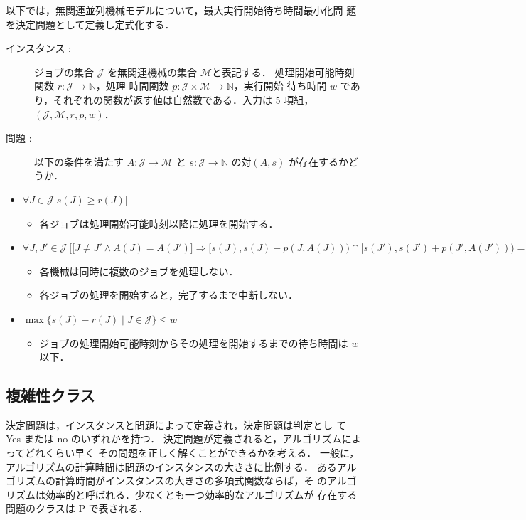 \documentclass[12pt]{optlab-bachelor}
\begin{document}
以下では，無関連並列機械モデルについて，最大実行開始待ち時間最小化問
題を決定問題として定義し定式化する．

\begin{description}

  \item[インスタンス : ] ジョブの集合 $\mathcal{J}$ を無関連機械の集合 $\mathcal{M}$と表記する．
  処理開始可能時刻関数 $r : \mathcal{J} \to \mathbb{N}$，処理
  時間関数 $p : \mathcal{J} \times \mathcal{M} \to \mathbb{N}$，実行開始
  待ち時間 $w$ であり，それぞれの関数が返す値は自然数である．入力は 5 項組，$(\mathcal{J}, \mathcal{M}, r, p, w)$．

  \item[問題 : ] 以下の条件を満たす $A : \mathcal{J} \to \mathcal{M}$ と $s : \mathcal{J} \to \mathbb{N}$ の対$(A,s)$ が存在するかどうか．
\end{description}

\begin{itemize}
  \item $\forall J \in \mathcal{J}\big[s(J) \ge r(J) \big]$
  \begin{itemize}
    \item 各ジョブは処理開始可能時刻以降に処理を開始する．
  \end{itemize}
  \item {\footnotesize $\forall J, J' \in \mathcal{J}\ \Big[ \big[J\ne J' \land A(J) = A(J')\big] \Rightarrow [s(J), s(J)+p(J,A(J))) \cap[s(J'), s(J')+p(J', A(J'))) = \emptyset \Big]$}
  \begin{itemize}
    \item 各機械は同時に複数のジョブを処理しない．
    \item 各ジョブの処理を開始すると，完了するまで中断しない．
  \end{itemize}
  \item $\max\big\{s(J) - r(J) \mid J \in \mathcal{J}\big\} \le w$
  \begin{itemize}
    \item ジョブの処理開始可能時刻からその処理を開始するまでの待ち時間は $w$ 以下．
  \end{itemize}
\end{itemize}

\subsection{複雑性クラス}
決定問題は，インスタンスと問題によって定義され，決定問題は判定とし
て Yes または no のいずれかを持つ．
決定問題が定義されると，アルゴリズムによってどれくらい早く
その問題を正しく解くことができるかを考える．
一般に，アルゴリズムの計算時間は問題のインスタンスの大きさに比例する．
あるアルゴリズムの計算時間がインスタンスの大きさの多項式関数ならば，そ
のアルゴリズムは効率的と呼ばれる．少なくとも一つ効率的なアルゴリズムが
存在する問題のクラスは P で表される．
\end{document}
